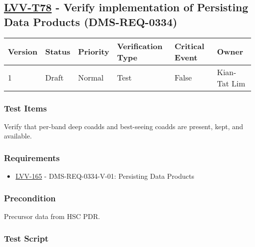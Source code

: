 \hypertarget{lvv-t78---verify-implementation-of-persisting-data-products-dms-req-0334}{%
\subsection{\texorpdfstring{\href{https://jira.lsstcorp.org/secure/Tests.jspa\#/testCase/LVV-T78}{LVV-T78}
- Verify implementation of Persisting Data Products
(DMS-REQ-0334)}{LVV-T78 - Verify implementation of Persisting Data Products (DMS-REQ-0334)}}\label{lvv-t78---verify-implementation-of-persisting-data-products-dms-req-0334}}

\begin{longtable}[]{@{}llllll@{}}
\toprule
Version & Status & Priority & Verification Type & Critical Event &
Owner\tabularnewline
\midrule
\endhead
1 & Draft & Normal & Test & False & Kian-Tat Lim\tabularnewline
\bottomrule
\end{longtable}

\hypertarget{test-items-54}{%
\subsubsection{Test Items}\label{test-items-54}}

Verify that per-band deep coadds and best-seeing coadds are present,
kept, and available.

\hypertarget{requirements-55}{%
\subsubsection{Requirements}\label{requirements-55}}

\begin{itemize}
\tightlist
\item
  \href{https://jira.lsstcorp.org/browse/LVV-165}{LVV-165} -
  DMS-REQ-0334-V-01: Persisting Data Products
\end{itemize}

\hypertarget{precondition-8}{%
\subsubsection{Precondition}\label{precondition-8}}

Precursor data from HSC PDR.

\hypertarget{test-script-55}{%
\subsubsection{Test Script}\label{test-script-55}}

